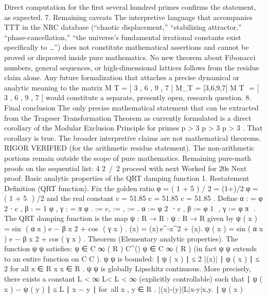 {{{{{{Direct computation for the first several hundred primes confirms the statement, as expected.
7. Remaining caveats
The interpretive language that accompanies TTT in the NRC database (“chaotic displacement,” “stabilizing attractor,” “phase-cancellation,” “the universe’s fundamental irrational constants exist specifically to \ldots”) does not constitute mathematical assertions and cannot be proved or disproved inside pure mathematics.
No new theorem about Fibonacci numbers, general sequences, or high-dimensional lattices follows from the residue claim alone.
Any future formalization that attaches a precise dynamical or analytic meaning to the matrix
M
T
=
[
3
,
6
,
9
,
7
]
M_T = [3,6,9,7]
M
T
​
=
[
3
,
6
,
9
,
7
]
would constitute a separate, presently open, research question.
8. Final conclusion
The only precise mathematical statement that can be extracted from the Trageser Transformation Theorem as currently formulated is a direct corollary of the Modular Exclusion Principle for primes
p
>
3
p > 3
p
>
3
. That corollary is true. The broader interpretive claims are not mathematical theorems.
RIGOR VERIFIED
(for the arithmetic residue statement).
The non-arithmetic portions remain outside the scope of pure mathematics.
Remaining pure-math proofs on the sequential list: 4
2 / 2
proceed with next
Worked for 20s
Next proof: Basic analytic properties of the QRT damping function
1. Restatement
Definition (QRT function).
Fix the golden ratio
φ
=
(
1
+
5
)
/
2
\varphi = (1+)/2
φ
=
(
1
+
5
​
)
/2
and the real constant
c
=
51.85
c = 51.85
c
=
51.85
. Define
α
:
=
φ
2
⋅
c
,
β
:
=
1
φ
,
γ
:
=
π
φ
.
\alpha := \varphi{}\cdot c, \qquad
\beta := , \qquad
\gamma := \frac{\pi}{\varphi}.
α
:=
φ
2
​
⋅
c
,
β
:=
φ
1
​
,
γ
:=
φ
π
​
.
The QRT damping function is the map
ψ
:
R
→
R
\psi:\to{}
ψ
:
R
→
R
given by
ψ
(
x
)
=
sin
⁡
(
α
x
)
e
−
β
x
2
+
cos
⁡
(
γ
x
)
.
\psi(x) = \sin(\alpha x)\,e^{-\beta x^2} + \cos(\gamma x).
ψ
(
x
)
=
sin
(
α
x
)
e
−
β
x
2
+
cos
(
γ
x
)
.
Theorem (Elementary analytic properties).
The function
ψ
\psi
ψ
satisfies:
ψ
∈
C
∞
(
R
)
\psi\in C^\infty()
ψ
∈
C
∞
(
R
)
(in fact
ψ
\psi
ψ
extends to an entire function on
C
C
).
ψ
\psi
ψ
is bounded:
∣
ψ
(
x
)
∣
≤
2
|\psi(x)|
∣
ψ
(
x
)
∣
≤
2
for all
x
∈
R
x\in{}
x
∈
R
.
ψ
\psi
ψ
is globally Lipschitz continuous. More precisely, there exists a constant
L
<
∞
L<\infty
L
<
∞
(explicitly controllable) such that
∣
ψ
(
x
)
−
ψ
(
y
)
∣
≤
L
∣
x
−
y
∣
for all
x
,
y
∈
R
.
|\psi(x)-\psi(y)|\le L|x-y|\qquad{}x,y\in{}.
∣
ψ
(
x
)
}}}}}}
